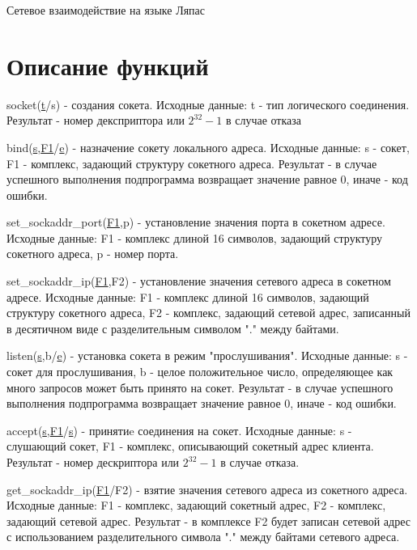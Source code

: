 \documentclass[12t,english,russian]{article}
\begin{document}
\huge
\begin{center}
{Сетевое взаимодействие на языке Ляпас}
\end{center}
\Large
\tableofcontents
\newpage

\large
\section[Описание функций]{Описание функций}
\label{socket}
\hspace{\parindent}
socket(\hyperref[type]{t}/s) - создания сокета. Исходные данные: t - тип логического соединения. Результат - номер дексприптора или $2^{32}-1$ в случае отказа

\label{bind}
bind(\hyperref[socket]{s},\hyperref[sockaddr]{F1}/\hyperref[error]{e}) - назначение сокету локального адреса. Исходные данные: s - сокет, F1 - комплекс, задающий структуру сокетного адреса. Результат - в случае успешного выполнения подпрограмма возвращает значение равное 0, иначе - код ошибки.

\label{set_sockaddr_port}
set\_sockaddr\_port(\hyperref[sockaddr]{F1},p) - установление значения порта в сокетном адресе. Исходные данные: F1 - комплекс длиной 16 символов, задающий структуру сокетного адреса, p - номер порта.

\label{set_sockaddr_ip}
set\_sockaddr\_ip(\hyperref[sockaddr]{F1},F2) - установление значения сетевого адреса в сокетном адресе. Исходные данные: F1 - комплекс длиной 16 символов, задающий структуру сокетного адреса, F2 - комплекс, задающий сетевой адрес, записанный в десятичном виде с разделительным символом "." между байтами.

\label{listen}
listen(\hyperref[socket]{s},b/\hyperref[error]{e}) - установка сокета в режим "прослушивания". Исходные данные: s - сокет для прослушивания, b - целое положительное число, определяющее как много запросов может быть принято на сокет. Результат - в случае успешного выполнения подпрограмма возвращает значение равное 0, иначе - код ошибки.

\label{accept}
accept(\hyperref[socket]{s},\hyperref[sockaddr]{F1}/\hyperref[socket]{s}) - принятиe соединения на сокет. Исходные данные: s - слушающий сокет, F1 - комплекс, описывающий сокетный адрес клиента. Результат - номер дескриптора или $2^{32}-1$ в случае отказа.

get\_sockaddr\_ip(\hyperref[sockaddr]{F1}/F2) - взятие значения сетевого адреса из сокетного адреса. Исходные данные: F1 - комплекс, задающий сокетный адрес, F2 - комплекс, задающий сетевой адрес. Результат - в комплексе F2 будет записан сетевой адрес с использованием разделительного символа "." между байтами сетевого адреса.
\end{document}
